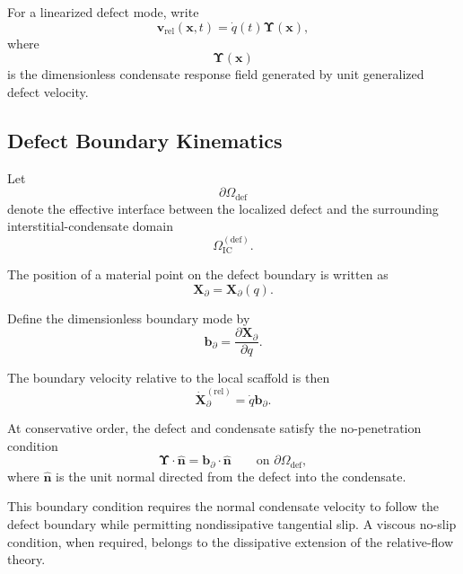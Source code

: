 For a linearized defect mode, write
\begin{equation}
    \boxed{ \mathbf{v}_{\mathrm{rel}}(\mathbf{x},t) = \dot{q}(t) \boldsymbol{\Upsilon}(\mathbf{x}) },
\end{equation}
where
\begin{equation}
    \boldsymbol{\Upsilon}(\mathbf{x})
\end{equation}
is the dimensionless condensate response field generated by unit generalized defect velocity.

\subsection{Defect Boundary Kinematics}

Let
\begin{equation}
    \partial\Omega_{\mathrm{def}}
\end{equation}
denote the effective interface between the localized defect and the surrounding interstitial-condensate domain
\begin{equation}
    \Omega_{\mathrm{IC}}^{(\mathrm{def})}.
\end{equation}

The position of a material point on the defect boundary is written as
\begin{equation}
    \mathbf{X}_{\partial} = \mathbf{X}_{\partial}(q).
\end{equation}

Define the dimensionless boundary mode by
\begin{equation}
    \boxed{ \mathbf{b}_{\partial} = \frac{\partial\mathbf{X}_{\partial}}{\partial q} }.
\end{equation}

The boundary velocity relative to the local scaffold is then
\begin{equation}
    \dot{\mathbf{X}}_{\partial}^{(\mathrm{rel})} = \dot{q} \mathbf{b}_{\partial}.
\end{equation}

At conservative order, the defect and condensate satisfy the no-penetration condition
\begin{equation}
    \boxed{ \boldsymbol{\Upsilon}\cdot\hat{\mathbf{n}} = \mathbf{b}_{\partial}\cdot\hat{\mathbf{n}} \qquad \text{on } \partial\Omega_{\mathrm{def}} },
\end{equation}
where $\hat{\mathbf{n}}$ is the unit normal directed from the defect into the condensate.

This boundary condition requires the normal condensate velocity to follow the defect boundary while permitting nondissipative tangential slip. A viscous no-slip condition, when required, belongs to the dissipative extension of the relative-flow theory.

